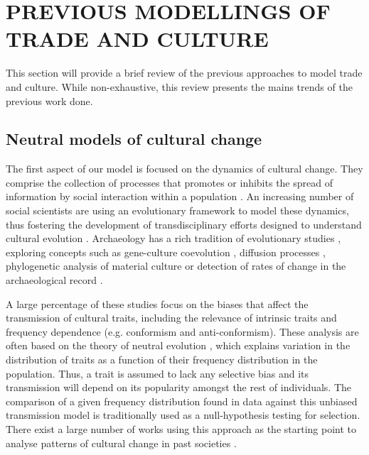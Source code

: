 \documentclass{wscpaperproc}
\begin{document}
\section{PREVIOUS MODELLINGS OF TRADE AND CULTURE}

This section will provide a brief review of the previous approaches to model trade and culture. While non-exhaustive, this review presents the mains trends of the previous work done.

\subsection{Neutral models of cultural change}

The first aspect of our model is focused on the dynamics of cultural change. They comprise the collection of processes that promotes or inhibits the spread of information by social interaction within a population \cite[3]{boyd_origin_2005}. An increasing number of social scientists are using an evolutionary framework to model these dynamics, thus fostering the development of transdisciplinary efforts designed to understand cultural evolution \cite{henrich_evolution_2003}. Archaeology has a rich tradition of evolutionary studies \cite{lycett_cultural_2015}, exploring concepts such as gene-culture coevolution \cite{burger_absence_2007}, diffusion processes \cite{fort_synthesis_2012}, phylogenetic analysis of material culture \cite{obrien_cladistics_2001} or detection of rates of change in the archaeological record \cite{premo_cultural_2014}.

A large percentage of these studies focus on the biases that affect the transmission of cultural traits, including the relevance of intrinsic traits and frequency dependence (e.g. conformism and anti-conformism). 
These analysis are often based on the theory of neutral evolution \cite{neiman_stylistic_1995}, which explains variation in the distribution of traits as a function of their frequency distribution in the population. Thus, a trait is assumed to lack any selective bias and its transmission will depend on its popularity amongst the rest of individuals. The comparison of a given frequency distribution found in data against this unbiased transmission model is traditionally used as a null-hypothesis testing for selection. There exist a large number of works using this approach as the starting point to analyse patterns of cultural change in past societies \cite{lipo_neutralitystyle_2001,shennan_ceramic_2001,steele_ceramic_2010,kandler_nonequilibrium_2013,porcic_exploring_2014,crema_approximate_2014}.
\end{document}
